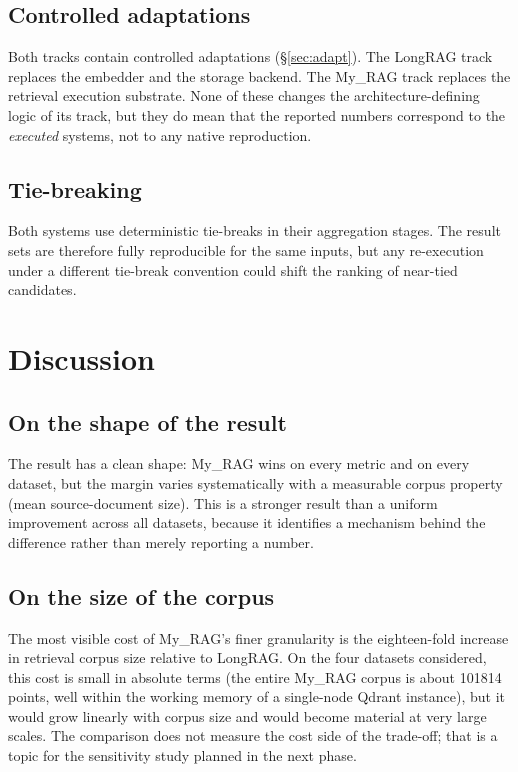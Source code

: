 \documentclass[11pt,a4paper]{article}
\begin{document}
\subsection{Controlled adaptations}
Both tracks contain controlled adaptations
(\S\ref{sec:adapt}). The LongRAG track replaces the embedder and
the storage backend. The My\_RAG track replaces the retrieval
execution substrate. None of these changes the architecture-defining
logic of its track, but they do mean that the reported numbers
correspond to the \emph{executed} systems, not to any native
reproduction.

\subsection{Tie-breaking}
Both systems use deterministic tie-breaks in their aggregation
stages. The result sets are therefore fully reproducible for the
same inputs, but any re-execution under a different tie-break
convention could shift the ranking of near-tied candidates.

\section{Discussion}

\subsection{On the shape of the result}
The result has a clean shape: My\_RAG wins on every metric and on
every dataset, but the margin varies systematically with a
measurable corpus property (mean source-document size). This is a
stronger result than a uniform improvement across all datasets,
because it identifies a mechanism behind the difference rather than
merely reporting a number.

\subsection{On the size of the corpus}
The most visible cost of My\_RAG's finer granularity is the
eighteen-fold increase in retrieval corpus size relative to
LongRAG. On the four datasets considered, this cost is small in
absolute terms (the entire My\_RAG corpus is about \num{101814}
points, well within the working memory of a single-node Qdrant
instance), but it would grow linearly with corpus size and would
become material at very large scales. The comparison does not
measure the cost side of the trade-off; that is a topic for the
sensitivity study planned in the next phase.
\end{document}
